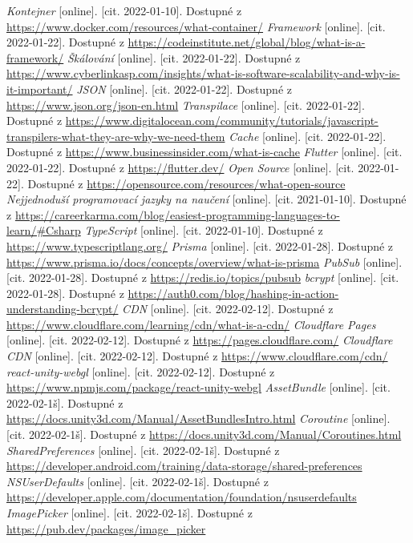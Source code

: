 \begin{thebibliography}{99}
     \textit{Kontejner} [online]. [cit. 2022-01-10]. Dostupné z \url{https://www.docker.com/resources/what-container/}
     \textit{Framework} [online]. [cit. 2022-01-22]. Dostupné z \url{https://codeinstitute.net/global/blog/what-is-a-framework/}
     \textit{Škálování} [online]. [cit. 2022-01-22]. Dostupné z \url{https://www.cyberlinkasp.com/insights/what-is-software-scalability-and-why-is-it-important/}
     \textit{JSON} [online]. [cit. 2022-01-22]. Dostupné z \url{https://www.json.org/json-en.html}
     \textit{Transpilace} [online]. [cit. 2022-01-22]. Dostupné z \url{https://www.digitalocean.com/community/tutorials/javascript-transpilers-what-they-are-why-we-need-them}
     \textit{Cache} [online]. [cit. 2022-01-22]. Dostupné z \url{https://www.businessinsider.com/what-is-cache}
     \textit{Flutter} [online]. [cit. 2022-01-22]. Dostupné z \url{https://flutter.dev/}
     \textit{Open Source} [online]. [cit. 2022-01-22]. Dostupné z \url{https://opensource.com/resources/what-open-source}
     \textit{Nejjednoduší programovací jazyky na naučení} [online]. [cit. 2021-01-10]. Dostupné z \url{https://careerkarma.com/blog/easiest-programming-languages-to-learn/#Csharp}
     \textit{TypeScript} [online]. [cit. 2022-01-10]. Dostupné z \url{https://www.typescriptlang.org/}
     \textit{Prisma} [online]. [cit. 2022-01-28]. Dostupné z \url{https://www.prisma.io/docs/concepts/overview/what-is-prisma}
     \textit{PubSub} [online]. [cit. 2022-01-28]. Dostupné z \url{https://redis.io/topics/pubsub}
     \textit{bcrypt} [online]. [cit. 2022-01-28]. Dostupné z \url{https://auth0.com/blog/hashing-in-action-understanding-bcrypt/}
     \textit{CDN} [online]. [cit. 2022-02-12]. Dostupné z \url{https://www.cloudflare.com/learning/cdn/what-is-a-cdn/}
     \textit{Cloudflare Pages} [online]. [cit. 2022-02-12]. Dostupné z \url{https://pages.cloudflare.com/}
     \textit{Cloudflare CDN} [online]. [cit. 2022-02-12]. Dostupné z \url{https://www.cloudflare.com/cdn/}
     \textit{react-unity-webgl} [online]. [cit. 2022-02-12]. Dostupné z \url{https://www.npmjs.com/package/react-unity-webgl}
     \textit{AssetBundle} [online]. [cit. 2022-02-1š]. Dostupné z \url{https://docs.unity3d.com/Manual/AssetBundlesIntro.html}
     \textit{Coroutine} [online]. [cit. 2022-02-1š]. Dostupné z \url{https://docs.unity3d.com/Manual/Coroutines.html}
     \textit{SharedPreferences} [online]. [cit. 2022-02-1š]. Dostupné z \url{https://developer.android.com/training/data-storage/shared-preferences}
     \textit{NSUserDefaults} [online]. [cit. 2022-02-1š]. Dostupné z \url{https://developer.apple.com/documentation/foundation/nsuserdefaults}
     \textit{ImagePicker} [online]. [cit. 2022-02-1š]. Dostupné z \url{https://pub.dev/packages/image_picker}
\end{thebibliography}


